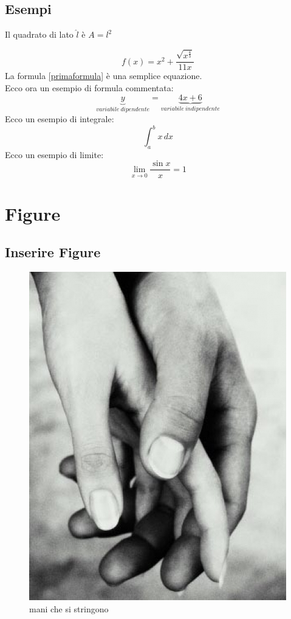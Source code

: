\section{Esempi}
Il quadrato di lato $\hat{l}$ è $A=l^2$

\begin{equation}f(x)=x^2+\frac{\sqrt{x^\frac{4}{3}}}{11x}\label{primaformula}\end{equation}
La formula \eqref{primaformula} è una semplice equazione.\\
Ecco ora un esempio di formula commentata:
\[
\underbrace{y}_{variabile\ dipendente}=\underbrace{4x+6}_{variabile\ indipendente}
\]
Ecco un esempio di integrale:
\[
\int_a^b{x\,dx}
\]
Ecco un esempio di limite:
\[
\lim_{x\to 0}
\frac{\sin x}{x}=1 
\]

\chapter{Figure}
\section{Inserire Figure}
\begin{figure}[H]
\centering
\includegraphics[scale=0.15]{mani}
\caption{mani che si stringono}
\label{fi}
\end{figure}

